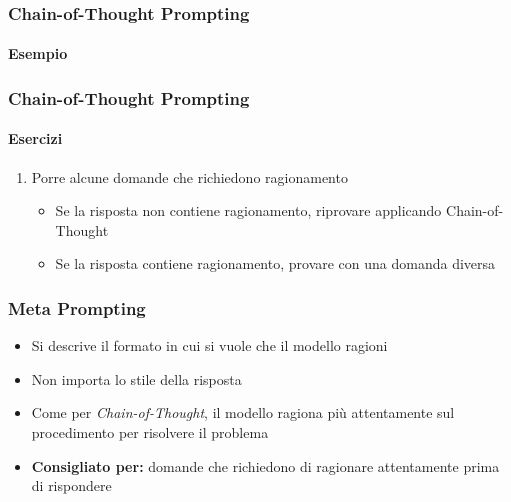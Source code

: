 \begin{exampleframe}
    \frametitle{Chain-of-Thought Prompting}
    \framesubtitle{Esempio}

\end{exampleframe}

\begin{exerciseframe}
    \frametitle{Chain-of-Thought Prompting}
    \framesubtitle{Esercizi}

    \begin{enumerate}
        \item Porre alcune domande che richiedono ragionamento
        \begin{itemize}
            \item Se la risposta non contiene ragionamento, riprovare applicando Chain-of-Thought
            \item Se la risposta contiene ragionamento, provare con una domanda diversa
        \end{itemize}
    \end{enumerate}
    
\end{exerciseframe}

\begin{contentframe}
    \frametitle{Meta Prompting}

    \begin{itemize}
        \item Si descrive il formato in cui si vuole che il modello ragioni
        \item Non importa lo stile della risposta

        \bigskip
        \item Come per \textit{Chain-of-Thought}, il modello ragiona più attentamente sul procedimento per risolvere il problema

        \bigskip
        \item \textbf{Consigliato per:} domande che richiedono di ragionare attentamente prima di rispondere
    \end{itemize}
\end{contentframe}

